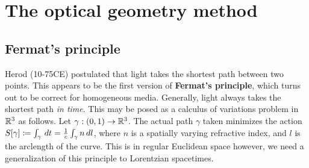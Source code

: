 \section{The optical geometry method}
\subsection{Fermat's principle}
Herod (10-75CE) postulated that light takes the shortest path between two points.
This appears to be the first version of \textbf{Fermat's principle}, which turns out to be correct for homogeneous media.
Generally, light always takes the shortest path \textit{in time}.
This may be posed as a calculus of variations problem in $\mathbb{R}^3$ as follows.
Let $\gamma: (0,1) \to \mathbb{R}^3$.
The actual path $\gamma$ taken minimizes the action $S[\gamma] \coloneqq \int_{\gamma} \, dt = \frac{1}{c}\int_{\gamma} n \, dl$, where $n$ is a spatially varying refractive index, and $l$ is the arclength of the curve.
This is in regular Euclidean space however, we need a generalization of this principle to Lorentzian spacetimes.
%
%
%
%
%

